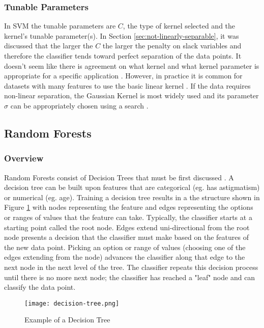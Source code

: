 \subsubsection{Tunable Parameters}
In SVM the tunable parameters are $C$, the type of kernel selected and the kernel's tunable parameter(s). In Section \ref{sec:not-linearly-separable}, it was discussed that the larger the $C$ the larger the penalty on slack variables and therefore the classifier tends toward perfect separation of the data points. It doesn't seem like there is agreement on what kernel and what kernel parameter is appropriate for a specific application \cite{cervantesComprehensiveSurveySupport2020}. However, in practice it is common for datasets with many features to use the basic linear kernel \cite{cervantesComprehensiveSurveySupport2020}. If the data requires non-linear separation, the Gaussian Kernel is most widely used and its parameter $\sigma$ can be appropriately chosen using a search \cite{cervantesComprehensiveSurveySupport2020}.


\clearpage
\subsection{Random Forests}
\subsubsection{Overview}
Random Forests consist of Decision Trees that must be first discussed \cite{liuNewMachineLearning2012}. A decision tree can be built upon features that are categorical (eg. has astigmatism) or numerical (eg. age). Training a decision tree results in a the structure shown in Figure \ref{fig:decision-tree} with nodes representing the feature and edges representing the options or ranges of values that the feature can take. Typically, the classifier starts at a starting point called the root node. Edges extend uni-directional from the root node presents a decision that the classifier must make based on the features of the new data point. Picking an option or range of values (choosing one of the edges extending from the node) advances the classifier along that edge to the next node in the next level of the tree. The classifier repeats this decision process until there is no more next node; the classifier has reached a "leaf" node and can classify the data point.

\begin{figure}[ht]
    \centering
    \texttt{[image: decision-tree.png]}
    \caption{Example of a Decision Tree \cite{leeDecisionTreesTheory}}
    \label{fig:decision-tree}
\end{figure}

